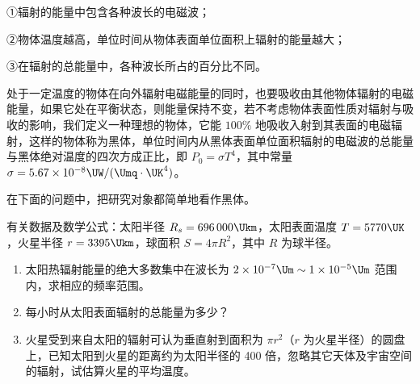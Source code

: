 \documentclass[\gkver]{gaokaozhenti}
\begin{document}
\begin{enumerate}
①辐射的能量中包含各种波长的电磁波；

②物体温度越高，单位时间从物体表面单位面积上辐射的能量越大；

③在辐射的总能量中，各种波长所占的百分比不同。

处于一定温度的物体在向外辐射电磁能量的同时，也要吸收由其他物体辐射的电磁能量，如果它处在平衡状态，则能量保持不变，若不考虑物体表面性质对辐射与吸收的影响，我们定义一种理想的物体，它能 $100\%$ 地吸收入射到其表面的电磁辐射，这样的物体称为黑体，单位时间内从黑体表面单位面积辐射的电磁波的总能量与黑体绝对温度的四次方成正比，即 $P_{0}=\sigma T^{4}$，其中常量 $\sigma=5.67\times10^{-8}\UW/(\Umq\cdot\UK^{4})$。

在下面的问题中，把研究对象都简单地看作黑体。

有关数据及数学公式：太阳半径 $R_{s}=696\,000\Ukm$，太阳表面温度 $T=5770\UK$，火星半径 $r=3395\Ukm$，球面积 $S=4\pi R^{2}$，其中 $R$ 为球半径。

\begin{enumerate}
\item
太阳热辐射能量的绝大多数集中在波长为 $2\times10^{-7}\Um\sim1\times10^{-5}\Um$ 范围内，求相应的频率范围。
\item
每小时从太阳表面辐射的总能量为多少？
\item
火星受到来自太阳的辐射可认为垂直射到面积为 $\pi r^{2}$（$r$ 为火星半径）的圆盘上，已知太阳到火星的距离约为太阳半径的 400 倍，忽略其它天体及宇宙空间的辐射，试估算火星的平均温度。
\end{enumerate}


\end{enumerate}
\end{document}
